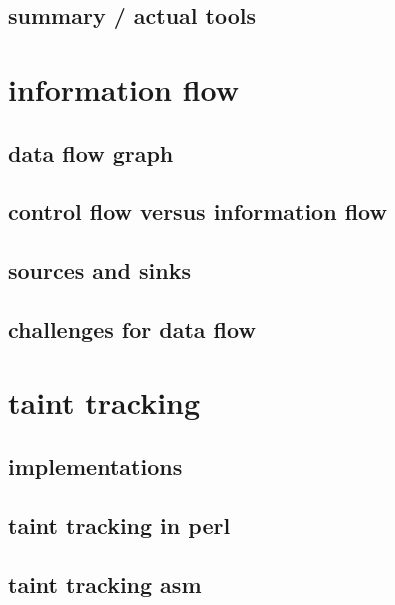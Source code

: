 \subsection{summary / actual tools}


\section{information flow}


\subsection{data flow graph}


\subsection{control flow versus information flow} 


\subsection{sources and sinks}


\subsection{challenges for data flow}


\section{taint tracking}


\subsection{implementations}


\subsection{taint tracking in perl}


\subsection{taint tracking asm}


